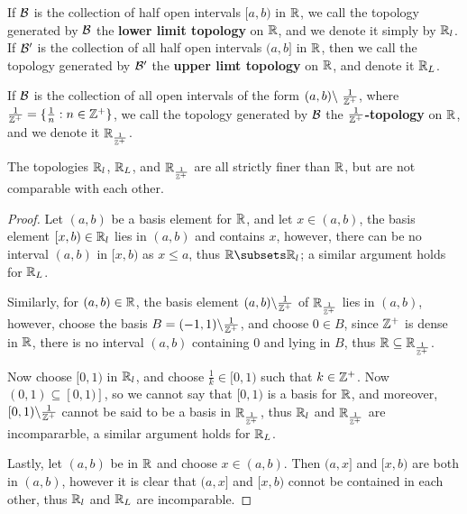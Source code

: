 \begin{definition}
    If $\mathcal{B}$ is the collection of half open intervals  $[a,b)$ in  $\mathbb{R}$, we call the 
    topology generated by  $\mathcal{B}$ the \textbf{lower limit topology} on $\mathbb{R}$, and we 
    denote it simply by  $\mathbb{R}_l$. If $\mathcal{B}'$ is the collection of all half open intervals  $(a,b]$ 
    in  $\mathbb{R}$, then we call the topology generated by  $\mathcal{B}'$ the \textbf{upper limt topology} 
    on $\mathbb{R}$, and denote it  $\mathbb{R}_L$.
\end{definition}

\begin{definition}
    If $\mathcal{B}$ is the collection of all open intervals of the form  $\com{(a,b)}{\ \frac{1}{\Z^+}}$, 
    where $\frac{1}{\mathbb{Z}^+}=\{\frac{1}{n}: n \in \mathbb{Z}^+\}$, we call the topology generated by $\mathcal{B}$ the 
    \textbf{$\frac{1}{\mathbb{Z}^+}$-topology} on $\mathbb{R}$, and we denote it  $\mathbb{R}_{\frac{1}{\mathbb{Z}^+}}$.
\end{definition} 

\begin{lemma}\label{1.2.4}
    The topologies $\mathbb{R}_l$,  $\mathbb{R}_L$, and  $\mathbb{R}_{\frac{1}{\mathbb{Z}^+}}$ are all strictly finer than $\mathbb{R}$, 
    but are not comparable with each other.
\end{lemma}
\begin{proof}
    Let $(a,b)$ be a basis element for  $\mathbb{R}$, and let  $x \in (a,b)$, the basis element $[x,b) \in \mathbb{R}_l$ 
    lies in $(a,b)$ and contains $x$, however, there can be no interval  $(a,b)$ in  $[x,b)$ as 
     $x \leq a$, thus  $\R \subsets \R_l$; a similar argument holds for  $\mathbb{R}_L$.

     Similarly, for  $(a,b) \in \mathbb{R}$, the basis element  $(a,b) \backslash  \frac{1}{\mathbb{Z}^+}$ of $\mathbb{R}_{\frac{1}{\mathbb{Z}^+}}$ 
     lies in $(a,b)$, however, choose the basis $B=(-1,1) \backslash \frac{1}{\mathbb{Z}^+}$, and 
     choose $0 \in B$, since  $\mathbb{Z}^+$ is dense in  $\mathbb{R}$, there is no interval  $(a,b)$ containing  $0$ 
     and lying in  $B$, thus  $\mathbb{R} \subseteq \mathbb{R}_{\frac{1}{\mathbb{Z}^+}}$.

     Now choose $[0,1)$ in  $\mathbb{R}_l$, and choose  $ \frac{1}{k} \in [0,1)$ such that $k \in \mathbb{Z}^+$. Now 
     $(0,1) \subseteq [0,1)]$, so we cannot say that $[0,1)$ is a basis for  $\mathbb{R}$, and moreover,  
     $[0,1) \backslash \frac{1}{\mathbb{Z}^+}$ cannot be said to be a basis in $\mathbb{R}_{\frac{1}{\mathbb{Z}^+}}$, thus 
     $\mathbb{R}_l$ and  $\mathbb{R}_{\frac{1}{\mathbb{Z}^+}}$ are incompararble, a similar argument holds for $\mathbb{R}_L$.

     Lastly, let  $(a,b)$ be in  $\mathbb{R}$ and choose  $x \in (a,b)$. Then $(a,x]$ and  $[x,b)$ are 
     both in  $(a,b)$, however it is clear that  $(a,x]$ and  $[x,b)$ connot be contained in each other, 
     thus $\mathbb{R}_l$ and  $\mathbb{R}_L$ are incomparable.
\end{proof}

